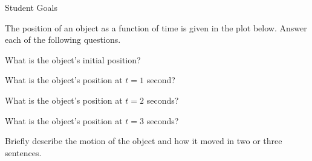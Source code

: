 


Student Goals 

\begin{problem}
\item The position of an object as a function of time is given in the plot
  below. Answer each of the following questions.

  \scalebox{0.5}{}

%

  \begin{subproblem}
  \item What is the object's initial position?
    \vfill

  \item What is the object's position at $t=1$ second?
    \vfill

  \item What is the object's position at $t=2$ seconds?
    \vfill

  \item What is the object's position at $t=3$ seconds?
    \vfill

  \item Briefly describe the motion of the object and how it moved in
    two or three sentences.
    \vfill
    \vfill

  \end{subproblem}


\end{problem}
